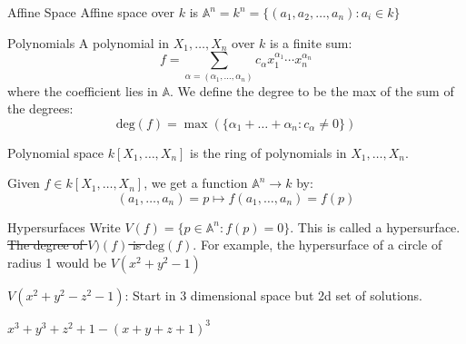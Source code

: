 \documentclass{report}
\begin{document}
\begin{definition}{Affine Space} 
    Affine space over $k$ is $\mathbb{A}^{n} = k^{n} = \{(a_{1}, a_{2}, \ldots, a_{n}) : a_{i} \in k\}$
\end{definition}

\begin{definition}{Polynomials}
    A polynomial in $X_{1}, \ldots, X_{n}$ over $k$ is a finite sum:
        \begin{equation*}
            f = \sum_{\alpha = (\alpha_{1}, \ldots, \alpha_{n})} c_{\alpha}x_{1}^{\alpha_{1}} \cdots x_{n}^{\alpha_{n}}
        \end{equation*}
    where the coefficient lies in $\mathbb{A}$. We define the degree to be the max of the sum of the degrees:
        \begin{equation*}
            \text{deg}(f) = \max(\{\alpha_{1} + \ldots + \alpha_{n}: c_{\alpha} \neq 0\})
        \end{equation*}
\end{definition}

\begin{definition}{Polynomial space}
    $k[X_{1}, \ldots, X_{n}]$ is the ring of polynomials in $X_{1}, \ldots, X_{n}$.
\end{definition}

    Given $f \in k[X_{1}, \ldots, X_{n}]$, we get a function $\mathbb{A}^{n} \rightarrow k$ by:
        \begin{equation*}
            (a_{1}, \ldots, a_{n}) = p \mapsto f(a_{1}, \ldots, a_{n}) = f(p)
        \end{equation*}

\begin{definition}{Hypersurfaces}
    Write $V(f) = \{p \in \mathbb{A}^{n}: f(p) = 0\}$. This is called a hypersurface. \st{The degree of $V)(f)$ is $\text{deg}(f)$}. For example, the hypersurface of a circle of radius 1 would be $V(x^{2} + y^{2} - 1)$
\end{definition}

\begin{examples}
    \begin{example}
        $V(x^{2} + y^{2} - z^{2} - 1)$: Start in 3 dimensional space but 2d set of solutions.
    \end{example}

    \begin{example}
        $x^{3} + y^{3} + z^{2} + 1 - (x + y + z + 1)^{3}$
    \end{example}
\end{examples}
\end{document}
